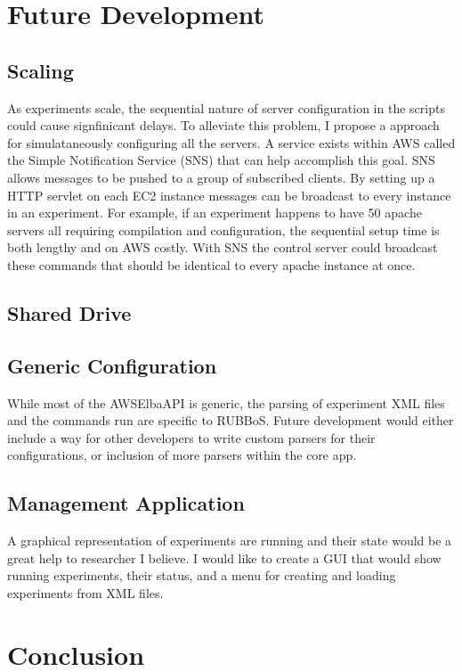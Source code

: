 \documentclass{article}
\begin{document}
\section{Future Development}
\subsection{Scaling}
As experiments scale, the sequential nature of server configuration in the scripts could cause signfinicant delays. To alleviate this problem, I propose a approach for simulataneously configuring all the servers.
A service exists within AWS called the Simple Notification Service (SNS) that can help accomplish this goal. SNS allows messages to be pushed to a group of subscribed clients. By setting up a HTTP servlet on each EC2 instance messages can be broadcast to every instance in an experiment. For example, if an experiment happens to have 50 apache servers all requiring compilation and configuration, the sequential setup time is both lengthy and on AWS costly. With SNS the control server could broadcast these commands that should be identical to every apache instance at once.
\subsection{Shared Drive}
\subsection{Generic Configuration}
While most of the AWSElbaAPI is generic, the parsing of experiment XML files and the commands run are specific to RUBBoS. Future development would either include a way for other developers to write custom parsers for their configurations, or inclusion of more parsers within the core app.
\subsection{Management Application}
A graphical representation of experiments are running and their state would be a great help to researcher I believe. I would like to create a GUI that would show running experiments, their status, and a menu for creating and loading experiments from XML files.
\section{Conclusion}



\end{document}
